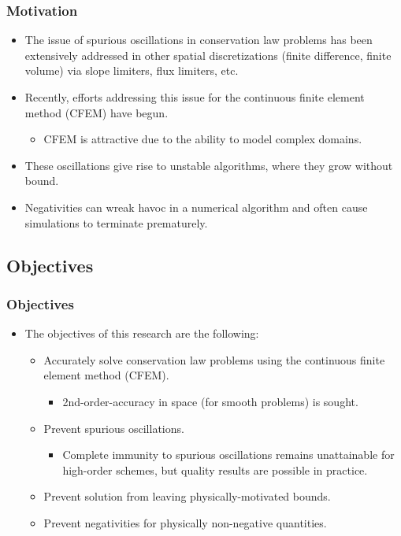 \documentclass{beamer} \useoutertheme{infolines}
\begin{document}
\begin{frame}
\frametitle{Motivation}

\begin{itemize}
  \item The issue of spurious oscillations in conservation law problems has
    been extensively addressed in other spatial discretizations (finite difference,
    finite volume) via slope limiters, flux limiters, etc.
  \item Recently, efforts addressing this issue for the continuous finite
    element method (CFEM) have begun.
  \begin{itemize}
    \item CFEM is attractive due to the ability to model complex domains.
  \end{itemize}
  \item These oscillations give rise to unstable algorithms, where they grow
    without bound.
  \item Negativities can wreak havoc in a numerical algorithm and often
    cause simulations to terminate prematurely.
\end{itemize}

\end{frame}
\subsection{Objectives}
\begin{frame}
\frametitle{Objectives}

\begin{itemize}
   \item The objectives of this research are the following:
   \begin{itemize}
      \item \textcolor{secondarycolorheavy}{Accurately solve conservation law
        problems} using the continuous finite element method (CFEM).
      \begin{itemize}
        \item 2nd-order-accuracy in space (for smooth problems) is sought.
      \end{itemize}
      \item \textcolor{secondarycolorheavy}{Prevent spurious oscillations}.
      \begin{itemize}
	\item Complete immunity to spurious oscillations remains unattainable for
          high-order schemes, but quality results are possible in practice.
      \end{itemize}
      \item \textcolor{secondarycolorheavy}{Prevent solution from leaving
        physically-motivated bounds}.
      \item \textcolor{secondarycolorheavy}{Prevent negativities}
        for physically non-negative quantities.
   \end{itemize}
\end{itemize}

\end{frame}
\end{document}
